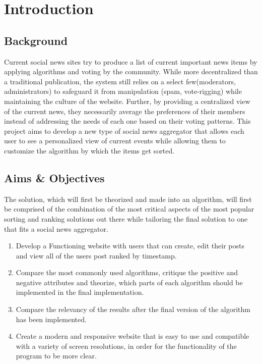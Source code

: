 
\chapter{Introduction}

\section{Background}
Current social news sites try to produce a list of current important news items by applying algorithms
and voting by the community. While more decentralized than a traditional publication, the system still
relies on a select few(moderators, administrators) to safeguard it from manipulation (spam, vote-rigging)
while maintaining the culture of the website. Further, by providing a centralized view of the current news,
they necessarily average the preferences of their members instead of addressing the needs of each one based on their voting patterns. This project aims to develop a new type of social news aggregator that allows each user to see a personalized view of current events while allowing them to customize the algorithm by which the items get sorted.

\section {Aims \& Objectives}
The solution, which will first be theorized and made into an algorithm, will first be comprised of the combination of the most critical aspects of the most popular sorting and ranking solutions out there while tailoring the final solution to one that fits a social news aggregator.

\begin{enumerate}
\item Develop a Functioning website with users that can create, edit their posts and view all of the users post ranked by timestamp.
\item Compare the most commonly used algorithms, critique the positive and negative attributes and theorize, which parts of each algorithm should be implemented in the final implementation.
\item Compare the relevancy of the results after the final version of the algorithm has been implemented.
\item Create a modern and responsive website that is easy to use and compatible with a variety of screen resolutions, in order for the functionality of the program to be more clear.
\end{enumerate}

